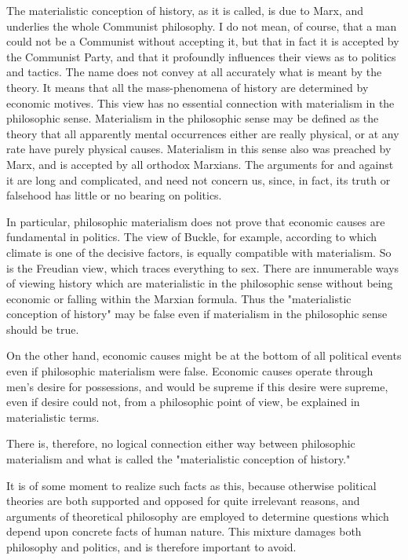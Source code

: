 The materialistic conception of history, as it is called, is due to Marx, and underlies the whole Communist philosophy. I do not mean, of course, that a man could not be a Communist without accepting it, but that in fact it is accepted by the Communist Party, and that it profoundly influences their views as to politics and tactics. The name does not convey at all accurately what is meant by the theory. It means that all the mass-phenomena of history are determined by economic motives. This view has no essential connection with materialism in the philosophic sense. Materialism in the philosophic sense may be defined as the theory that all apparently mental occurrences either are really physical, or at any rate have purely physical causes. Materialism in this sense also was preached by Marx, and is accepted by all orthodox Marxians. The arguments for and against it are long and complicated, and need not concern us, since, in fact, its truth or falsehood has little or no bearing on politics.

In particular, philosophic materialism does not prove that economic causes are fundamental in politics. The view of Buckle, for example, according to which climate is one of the decisive factors, is equally compatible with materialism. So is the Freudian view, which traces everything to sex. There are innumerable ways of viewing history which are materialistic in the philosophic sense without being economic or falling within the Marxian formula. Thus the "materialistic conception of history" may be false even if materialism in the philosophic sense should be true.

On the other hand, economic causes might be at the bottom of all political events even if philosophic materialism were false. Economic causes operate through men's desire for possessions, and would be supreme if this desire were supreme, even if desire could not, from a philosophic point of view, be explained in materialistic terms.

There is, therefore, no logical connection either way between philosophic materialism and what is called the "materialistic conception of history."

It is of some moment to realize such facts as this, because otherwise political theories are both supported and opposed for quite irrelevant reasons, and arguments of theoretical philosophy are employed to determine questions which depend upon concrete facts of human nature. This mixture damages both philosophy and politics, and is therefore important to avoid.

